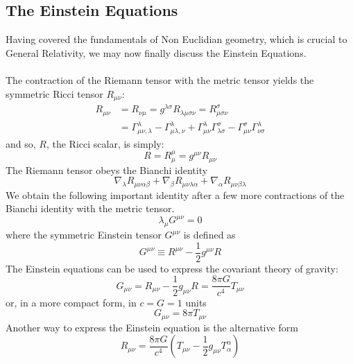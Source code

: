 \documentclass[a4paper,12pt]{extarticle}
\newcommand{\mn}{{\mu\nu}}
\numberwithin{equation}{subsection}
\begin{document}
\subsection{The Einstein Equations}
Having covered the fundamentals of Non Euclidian geometry, which is crucial to General Relativity, we may now finally discuss the Einstein Equations.\\ \\
The contraction of the Riemann tensor with the metric tensor yields the symmetric Ricci tensor $R_\mn$: 
\begin{align}
R_{\mu\nu}&=R_{\nu\mu}=g^{\lambda\sigma}R_{\lambda\mu\sigma\nu}=R^\sigma_{\mu\sigma\nu}\\
&=\Gamma^\lambda_{\mu\nu,\lambda}-\Gamma^{\lambda}_{\mu\lambda,\nu}+\Gamma_{\mu\nu}^\lambda\Gamma^\sigma_{\lambda\sigma}-\Gamma_{\mu\nu}^\sigma\Gamma^\lambda_{\nu\sigma}
\end{align}
and so, $R$, the Ricci scalar, is simply:
\begin{equation}
R=R_\mu^\mu=g^{\mu\nu}R_{\mu\nu}
\end{equation}
The Riemann tensor obeys the Bianchi identity
\begin{equation}
\nabla_\lambda R_{\mu\nu\alpha\beta}+\nabla_\beta R_{\mu\nu\lambda\alpha}+\nabla_\alpha R_{\mu\nu\beta\lambda}
\end{equation}
We obtain the following important identity after a few more contractions of the Bianchi identity with the metric tensor.
\begin{equation}
\lambda_\mu G^{\mu\nu}=0
\end{equation}
where the symmetric Einstein tensor $G^{\mu\nu}$ is defined as
\begin{equation}
G^{\mu\nu}\equiv R^{\mu\nu}-\frac{1}{2}g^{\mu\nu}R
\end{equation}
The Einstein equations can be used to express the covariant theory of gravity:
\begin{equation}
G_{\mu\nu}=R_{\mu\nu}-\frac{1}{2}g_{\mu\nu}R=\frac{8\pi G}{c^4}T_{\mu\nu}
\end{equation}
or, in a more compact form, in $c=G=1$ units
\begin{equation}
G_{\mu\nu}=8\pi T_{\mu\nu}
\end{equation}
Another way to express the Einstein equation is the alternative form
\begin{equation}
R_{\mu\nu}=\frac{8\pi G}{c^4}\left(T_{\mu\nu}-\frac{1}{2}g_{\mu\nu}T^\alpha_\alpha\right)
\end{equation}
\newpage
\end{document}

